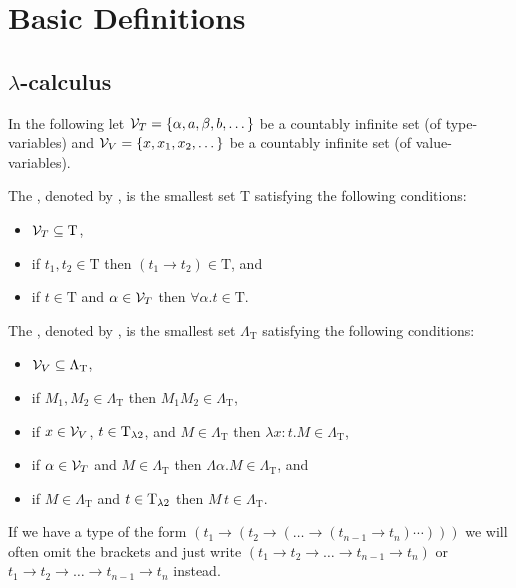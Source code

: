\section{Basic Definitions}\label{sec.2}
\subsection{$\lambda$-calculus \lambdaTwo}
In the following let $\mathcal{V}_T=\{\alpha,a,\beta,b,\dots\}$ be a countably infinite set (of type-variables) and $\mathcal{V}_V=\{x,x_1,x_2,\dots\}$ be a countably infinite set (of value-variables).
\begin{definition}\label{def.2.1}
	The , denoted by \lambdaTypes{}, is the smallest set T satisfying the following conditions: %
	\begin{itemize}
		\item $\mathcal{V}_T\subseteq\text{T}$,
		\item if $t_1,t_2\in\text{T}$ then $(t_1\to t_2)\in\text{T}$, and
		\item if $t\in\text{T}$ and $\alpha\in\mathcal{V}_T$ then $\forall\alpha.t\in\text{T}$.
	\end{itemize}
	
	The , denoted by \lambdaTerms{}, is the smallest set $\Lambda_\text{T}$ satisfying the following conditions: %
	\begin{itemize}
		\item $\mathcal{V}_V\subseteq\Lambda_\text{T}$,
		\item if $M_1,M_2\in\Lambda_\text{T}$ then $M_1M_2\in\Lambda_\text{T}$,
		\item if $x\in\mathcal{V}_V$, $t\in\text{T}_{\lambda2}$, and $M\in\Lambda_\text{T}$ then $\lambda x:t.M\in\Lambda_\text{T}$,
		\item if $\alpha\in\mathcal{V}_T$ and $M\in\Lambda_\text{T}$ then $\Lambda \alpha.M\in\Lambda_\text{T}$, and
		\item if $M\in\Lambda_\text{T}$ and $t\in\text{T}_{\lambda2}$ then $M\,t\in\Lambda_\text{T}$.
	\end{itemize}
\end{definition}
If we have a type of the form $(t_1\to(t_2\to(\dots \to(t_{n-1}\to t_n)\cdots)))$ we will often omit the brackets and just write $(t_1\to t_2\to\dots\to t_{n-1}\to t_n)$ or $t_1\to t_2\to\dots \to t_{n-1}\to t_n$ instead. %

